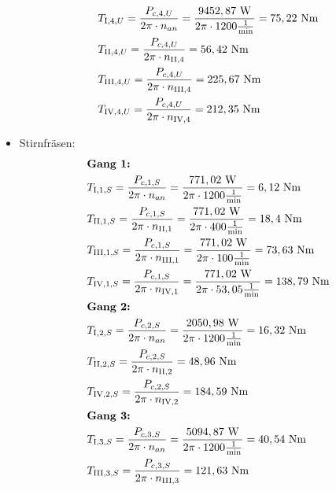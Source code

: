 \begin{itemize}
\begin{align*}
	&T_{\mathord{\mathrm{I}},4,U} = \frac{P_{c,4,U}}{2 \pi \cdot n_{an}} = \frac{9452,87 \text{ W} }{2 \pi \cdot 1200 \frac{1}{\text{min}}} =75,22 \text{ Nm} \\
	&T_{\mathord{\mathrm{II}},4,U} = \frac{P_{c,4,U}}{2 \pi \cdot n_{\mathord{\mathrm{II}},4}} =56,42 \text{ Nm} \\
	&T_{\mathord{\mathrm{III}},4,U} = \frac{P_{c,4,U}}{2 \pi \cdot n_{\mathord{\mathrm{III}},4}} = 225,67 \text{ Nm} \\
	&T_{\mathord{\mathrm{IV}},4,U} = \frac{P_{c,4,U}}{2 \pi \cdot n_{\mathord{\mathrm{IV}},4}} =212,35 \text{ Nm} \\
\end{align*}	
\item {Stirnfräsen: }
\begin{align*}
	&\textbf{Gang 1: } \\
	&T_{\mathord{\mathrm{I}},1,S} = \frac{P_{c,1,S}}{2 \pi \x n_{an}} = \frac{771,02 \text{ W} }{2 \pi \x 1200 \frac{1}{\text{min}}} = 6,12 \text{ Nm} \\
	&T_{\mathord{\mathrm{II}},1,S} = \frac{P_{c,1,S}}{2 \pi \x n_{\mathord{\mathrm{II}},1}} = \frac{771,02 \text{ W} }{2 \pi \x 400 \frac{1}{\text{min}}} = 18,4 \text{ Nm} \\
	&T_{\mathord{\mathrm{III}},1,S} = \frac{P_{c,1,S}}{2 \pi \x n_{\mathord{\mathrm{III}},1}} = \frac{771,02 \text{ W} }{2 \pi \x 100 \frac{1}{\text{min}}} = 73,63 \text{ Nm} \\
	&T_{\mathord{\mathrm{IV}},1,S} = \frac{P_{c,1,S}}{2 \pi \x n_{\mathord{\mathrm{IV}},1}} = \frac{771,02 \text{ W} }{2 \pi \x 53,05 \frac{1}{\text{min}}} =138,79 \text{ Nm} \\
	&\textbf{Gang 2: } \\
	&T_{\mathord{\mathrm{I}},2,S} = \frac{P_{c,2,S}}{2 \pi \x n_{an}} = \frac{2050,98 \text{ W} }{2 \pi \x 1200 \frac{1}{\text{min}}} = 16,32 \text{ Nm} \\
	&T_{\mathord{\mathrm{II}},2,S} = \frac{P_{c,2,S}}{2 \pi \x n_{\mathord{\mathrm{II}},2}} = 48,96 \text{ Nm} \\
	&T_{\mathord{\mathrm{IV}},2,S} = \frac{P_{c,2,S}}{2 \pi \x n_{\mathord{\mathrm{IV}},2}} = 184,59 \text{ Nm} \\
	&\textbf{Gang 3: } \\
	&T_{\mathord{\mathrm{I}},3,S} = \frac{P_{c,3,S}}{2 \pi \x n_{an}} = \frac{5094,87 \text{ W} }{2 \pi \x 1200 \frac{1}{\text{min}}} = 40,54 \text{ Nm} \\
	&T_{\mathord{\mathrm{III}},3,S} = \frac{P_{c,3,S}}{2 \pi \x n_{\mathord{\mathrm{III}},3}} = 121,63 \text{ Nm} \\

\end{align*}
\end{itemize}
